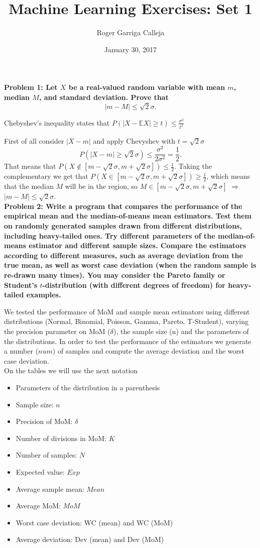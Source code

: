 \documentclass[11pt, english]{article}
\title{Machine Learning Exercises: Set 1}
\author{Roger Garriga Calleja}
\date{January 30, 2017}
\begin{document}
\maketitle

\textbf{Problem 1: Let $X$ be a real-valued random variable with mean $m$, median $M$, and standard deviation. Prove that}
$$|m-M|\leq\sqrt{2}\sigma.$$

Chebyshev's inequality states that $P(|X-\mathbb{E}X|\geq t)\leq \frac{\sigma^2}{t^2}$

First of all consider $|X-m|$ and apply Chevyshev with $t=\sqrt{2}\sigma$
$$P(|X-m|\geq\sqrt{2}\sigma)\leq\frac{\sigma^2}{2\sigma^2}=\frac{1}{2}.$$
That means that $P(X\notin [m-\sqrt{2}\sigma,m+\sqrt{2}\sigma])\leq\frac{1}{2}$. Taking the complementary we get that $P(X\in [m-\sqrt{2}\sigma,m+\sqrt{2}\sigma])\geq\frac{1}{2}$, which means that the median $M$ will be in the region, so $M\in [m-\sqrt{2}\sigma,m+\sqrt{2}\sigma]$ $\Rightarrow$ $|m-M|\leq \sqrt{2}\sigma$.\\

\textbf{Problem 2: Write a program that compares the performance of the empirical mean and the median-of-means mean estimators. Test them on randomly generated samples drawn from different distributions, including heavy-tailed ones. Try different parameters of the median-of-means estimator and different sample sizes. Compare the estimators according to different measures, such as average deviation from the true mean, as well as worst case deviation (when the random sample is re-drawn many times). You may consider the Pareto family or Student’s $t$-distribution (with different degrees of freedom) for heavy-tailed examples.\\}

We tested the performance of MoM and sample mean estimators using different distributions (Normal, Binomial, Poisson, Gamma, Pareto, T-Student), varying the precision parameter on MoM ($\delta$), the sample size (n) and the parameters of the distributions. In order to test the performance of the estimators we generate a number ($num$) of samples and compute the average deviation and the worst case deviation.\\

On the tables we will use the next notation
\begin{itemize}
	\item Parameters of the distribution in a parenthesis
	\item Sample size: $n$
	\item Precision of MoM: $\delta$
	\item Number of divisions in MoM: $K$
	\item Number of samples: $N$
	\item Expected value: $Exp$
	\item Average sample mean: $Mean$
	\item Average MoM: $MoM$
	\item Worst case deviation: WC (mean) and WC (MoM)
	\item Average deviation: Dev (mean) and Dev (MoM)

\end{itemize}
\end{document}

